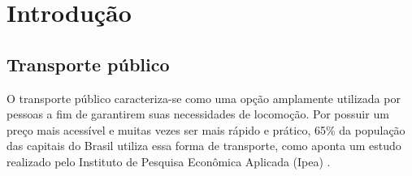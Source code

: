 \chapter{Introdução}
\label{Cap:Intro}
\begin{comment} 
\indent
\par Este capítulo apresenta conceitos iniciais do projeto, tais como justificativa, objetivos, panorama econômico, questão central da pesquisa e impactos.
\end{comment} 


\section{Transporte público}
\indent
\par O transporte público caracteriza-se como uma opção amplamente utilizada por pessoas a fim de garantirem suas necessidades de locomoção. Por possuir um preço mais acessível e muitas vezes ser mais rápido e prático, 65\% da população das capitais do Brasil utiliza essa forma de transporte, como aponta um estudo realizado pelo Instituto de Pesquisa Econômica Aplicada (Ipea) \cite{Peduzzi2011}.

